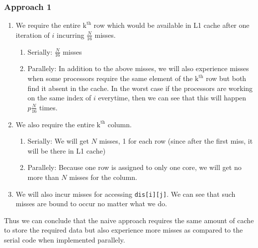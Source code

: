 \documentclass{article}
\begin{document}
\subsubsection{Approach 1}
\begin{enumerate}
    \item We require the entire $\mathrm{k}^{\mathrm{th}}$ row which would be available in L1 cache after one iteration of $i$ incurring $\frac{N}{16}$ misses. 
    \begin{enumerate}
        \item Serially: $\frac{N}{16}$ misses
        \item Parallely: In addition to the above misses, we will also experience misses when some processors require the same element of the $\mathrm{k}^{\mathrm{th}}$ row but both find it absent in the cache. In the worst case if the processors are working on the same index of $i$ everytime, then we can see that this will happen $p\frac{N}{16}$ times.
    \end{enumerate}
    \item We also require the entire $\mathrm{k}^{\mathrm{th}}$ column.
    \begin{enumerate}
        \item Serially: We will get $N$ misses, 1 for each row (since after the first miss, it will be there in L1 cache)
        \item Parallely: Because one row is assigned to only one core, we will get no more than $N$ misses for the column.
    \end{enumerate}
    \item We will also incur misses for accessing \texttt{dis[i][j]}. We can see that such misses are bound to occur no matter what we do.
\end{enumerate}
Thus we can conclude that the naive approach requires the same amount of cache to store the required data but also experience more misses as compared to the serial code when implemented parallely.
\end{document}

